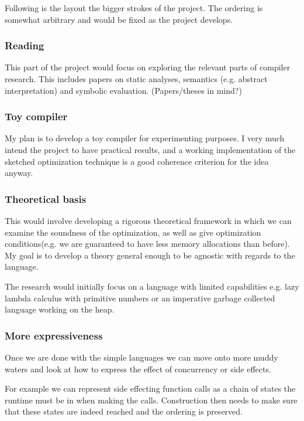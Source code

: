 \documentclass[a4paper]{article}
\begin{document}
Following is the layout the bigger strokes of the project. The ordering is somewhat arbitrary and would be fixed as the project develops.

\subsubsection*{Reading}

This part of the project would focus on exploring the relevant parts of compiler research. This includes papers on static analyses, semantics (e.g. abstract interpretation) and symbolic evaluation. (Papers/theses in mind?)

\subsubsection*{Toy compiler}

My plan is to develop a toy compiler for experimenting purposes. I very much intend the project to have practical results, and a working implementation of the sketched optimization technique is a good coherence criterion for the idea anyway.

\subsubsection*{Theoretical basis}

This would involve developing a rigorous theoretical framework in which we can examine the soundness of the optimization, as well as give optimization conditions(e.g. we are guaranteed to have less memory allocations than before). My goal is to develop a theory general enough to be agnostic with regards to the language.

The research would initially focus on a language with limited capabilities e.g. lazy lambda calculus with primitive numbers or an imperative garbage collected language working on the heap.

\subsubsection*{More expressiveness}

Once we are done with the simple languages we can move onto more muddy waters and look at how to express the effect of concurrency or side effects.

For example we can represent side effecting function calls as a chain of states the runtime must be in when making the calls. Construction then needs to make sure that these states are indeed reached and the ordering is preserved.
\end{document}
